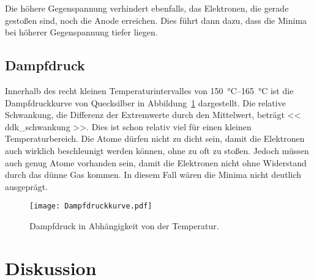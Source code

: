 Die höhere Gegenspannung verhindert ebenfalls, das Elektronen, die gerade
gestoßen sind, noch die Anode erreichen. Dies führt dann dazu, dass die Minima
bei höherer Gegenspannung tiefer liegen.

\subsection{Dampfdruck}

Innerhalb des recht kleinen Temperaturintervalles von
\SIrange{150}{165}{\celsius} ist die Dampfdruckkurve von Quecksilber in
Abbildung~\ref{fig:Dampfdruckkurve} dargestellt. Die relative Schwankung, die
Differenz der Extremwerte durch den Mittelwert, beträgt \num{<< ddk_schwankung
>>}. Dies ist schon relativ viel für einen kleinen Temperaturbereich. Die Atome
dürfen nicht zu dicht sein, damit die Elektronen auch wirklich beschleunigt
werden können, ohne zu oft zu stoßen. Jedoch müssen auch genug Atome vorhanden
sein, damit die Elektronen nicht ohne Widerstand durch das dünne Gas kommen. In
diesem Fall wären die Minima nicht deutlich ausgeprägt.

\begin{figure}[htbp]
    \centering
    \texttt{[image: Dampfdruckkurve.pdf]}
    \caption{%
        Dampfdruck in Abhängigkeit von der Temperatur.
    }
    \label{fig:Dampfdruckkurve}
\end{figure}

\section{Diskussion}

\printbibliography



